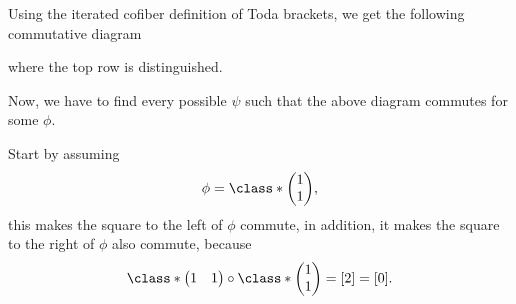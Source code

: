 \begin{example}
	Using the iterated cofiber definition of Toda brackets, we get the following commutative diagram
	\begin{center}
	\end{center}
	where the top row is distinguished.

	Now, we have to find every possible \( \psi \) such that the above diagram commutes for some \( \phi \).

	Start by assuming
	\[ 
		\phi = \class*{
			\begin{pmatrix}
				1 \\
				1
			\end{pmatrix}
		},
	\]
	this makes the square to the left of \( \phi \) commute, in addition, it makes the square to the right of \( \phi \) also commute, because
	\[
		\class*{\begin{pmatrix} 1 & 1 \end{pmatrix}} \circ
		\class*{\begin{pmatrix}
			1 \\
			1
		\end{pmatrix}}
		=
		[2] = [0].
	\]


\end{example}
